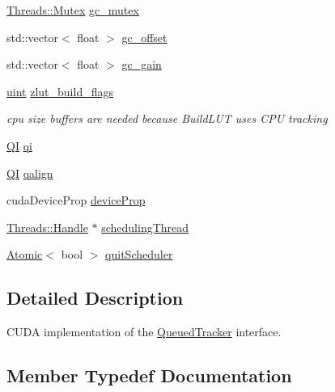 \begin{DoxyCompactItemize}
\item 
\hyperlink{struct_threads_1_1_mutex}{Threads\+::\+Mutex} \hyperlink{class_queued_c_u_d_a_tracker_aea7843385e4604dc38a6f1fc7b4f2811}{gc\+\_\+mutex}
\item 
std\+::vector$<$ float $>$ \hyperlink{class_queued_c_u_d_a_tracker_ae7be3e341a4086a64581d5429afd546d}{gc\+\_\+offset}
\item 
std\+::vector$<$ float $>$ \hyperlink{class_queued_c_u_d_a_tracker_a86866ae12a13f953194b0c5398c5c0d8}{gc\+\_\+gain}
\item 
\hyperlink{std__incl_8h_a91ad9478d81a7aaf2593e8d9c3d06a14}{uint} \hyperlink{class_queued_c_u_d_a_tracker_a7842914186ce30357a10595f79ef3244}{zlut\+\_\+build\+\_\+flags}
\begin{DoxyCompactList}\small\item\em cpu size buffers are needed because Build\+L\+UT uses C\+PU tracking \end{DoxyCompactList}\item 
\hyperlink{class_q_i}{QI} \hyperlink{class_queued_c_u_d_a_tracker_a885a0274a85bd6cddbb93d0c3a3cb422}{qi}
\item 
\hyperlink{class_q_i}{QI} \hyperlink{class_queued_c_u_d_a_tracker_a4ad3ddecc21aa3c9b7a706bd18364f7d}{qalign}
\item 
cuda\+Device\+Prop \hyperlink{class_queued_c_u_d_a_tracker_a60ba8b15a56739a7a26a538d23b7ec92}{device\+Prop}
\item 
\hyperlink{struct_threads_1_1_handle}{Threads\+::\+Handle} $\ast$ \hyperlink{class_queued_c_u_d_a_tracker_a419b8e04e631f1711fdfad84943df22c}{scheduling\+Thread}
\item 
\hyperlink{class_atomic}{Atomic}$<$ bool $>$ \hyperlink{class_queued_c_u_d_a_tracker_a277551e623212420a3c18dec6662c626}{quit\+Scheduler}
\end{DoxyCompactItemize}


\subsection{Detailed Description}
C\+U\+DA implementation of the \hyperlink{class_queued_tracker}{Queued\+Tracker} interface. 

\subsection{Member Typedef Documentation}
